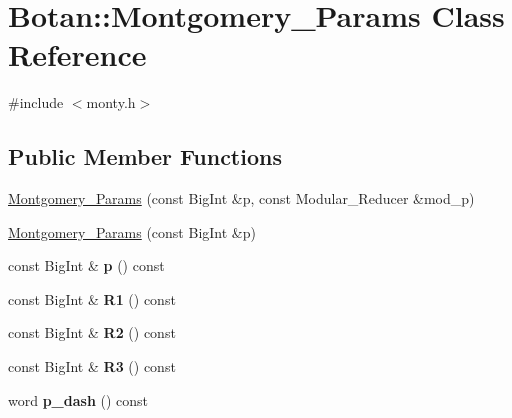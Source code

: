\hypertarget{class_botan_1_1_montgomery___params}{}\section{Botan\+:\+:Montgomery\+\_\+\+Params Class Reference}
\label{class_botan_1_1_montgomery___params}


{\ttfamily \#include $<$monty.\+h$>$}

\subsection*{Public Member Functions}
\begin{DoxyCompactItemize}
\item 
\hyperlink{class_botan_1_1_montgomery___params_a95369b9cae36b8b775035caf2bbb020c}{Montgomery\+\_\+\+Params} (const Big\+Int \&p, const Modular\+\_\+\+Reducer \&mod\+\_\+p)
\item 
\hyperlink{class_botan_1_1_montgomery___params_a601d7bb782f3d718f68ffaed95e216df}{Montgomery\+\_\+\+Params} (const Big\+Int \&p)
\item 
\mbox{\label{class_botan_1_1_montgomery___params_a0d556b89b82fc41720f37b9092bc875d}} 
const Big\+Int \& {\bfseries p} () const
\item 
\mbox{\label{class_botan_1_1_montgomery___params_a2330350ab7a55e5f56c34a806f879d3e}} 
const Big\+Int \& {\bfseries R1} () const
\item 
\mbox{\label{class_botan_1_1_montgomery___params_a9bf0665f65e17f946569b90f91c0bf43}} 
const Big\+Int \& {\bfseries R2} () const
\item 
\mbox{\label{class_botan_1_1_montgomery___params_a9c06b32e68c8fcc28f46683145f730dc}} 
const Big\+Int \& {\bfseries R3} () const
\item 
\mbox{\label{class_botan_1_1_montgomery___params_af0f2c6567a8fecd9028d8611ed5383a8}} 
word {\bfseries p\+\_\+dash} () const
\item 
\mbox{\label{class_botan_1_1_montgomery___params_a5ec2a1e82b7b23aebe81773434d3e50d}} 

\end{DoxyCompactItemize}

